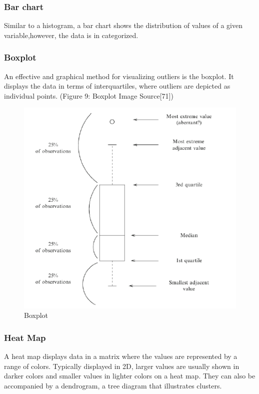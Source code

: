 \documentclass[11pt,]{article}
\begin{document}
\subsubsection{Bar chart}\label{bar-chart}

Similar to a histogram, a bar chart shows the distribution of values of
a given variable,however, the data is in categorized.

\subsubsection{Boxplot}\label{boxplot}

An effective and graphical method for visualizing outliers is the
boxplot. It displays the data in terms of interquartiles, where outliers
are depicted as individual points. (Figure 9: Boxplot Image
Source{[}71{]})

\begin{figure}

{\centering \includegraphics{thesis_files/figure-latex/unnamed-chunk-13-1} 

}

\caption{Boxplot}\label{fig:unnamed-chunk-13}
\end{figure}

\subsubsection{Heat Map}\label{heat-map}

A heat map displays data in a matrix where the values are represented by
a range of colors. Typically displayed in 2D, larger values are usually
shown in darker colors and smaller values in lighter colors on a heat
map. They can also be accompanied by a dendrogram, a tree diagram that
illustrates clusters.
\end{document}

